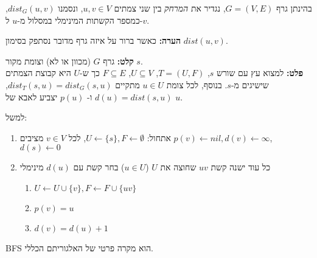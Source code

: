 \begin{definition}[מרחק]
בהינתן גרף 
$G = (V, E)$,
נגדיר את 
\emph{המרחק}
בין שני צמתים 
$u,v \in V$,
ונסמנו 
$dist_G(u,v)$,
כמספר הקשתות המינימלי במסלול מ-$u$ ל-$v$.
\end{definition}
\textbf{הערה:}
כאשר ברור על איזה גרף מדובר נסתפק בסימון 
$dist(u,v)$.

\vspace{5mm}
\textbf{קלט:}
גרף $G$ (מכוון או לא) וצומת מקור $s$.
\\
\textbf{פלט:}
למצוא עץ עם שורש $s$,
$T = (U, F)$, 
$U \subseteq V$, 
$F \subseteq E$
כך ש-$U$ היא קבוצת הצמתים שישיגים מ-$s$.
בנוסף, לכל צומת 
$u \in U$
מתקיים
$dist_T(s, u) = dist_G(s, u)$,
$d(u) = dist(s,u)$
ו-%
$p(u)$
יצביע לאבא של 
$u$.

למשל:
\begin{center}
\end{center}

\begin{enumerate}
\item
אתחול:
$U \leftarrow \{s\}, F \leftarrow \emptyset$, 
לכל 
$v \in V$
מציבים
$p(v) \leftarrow nil, d(v) \leftarrow \infty$,
$d(s) \leftarrow 0$
\item 
\label{item:bfs:while}
כל עוד ישנה קשת 
$uv$
שחוצה את $U$ 
($u \in U$)
בחר קשת עם 
$d(u)$
מינימלי
	\begin{enumerate}
	\item
	$U \leftarrow U \cup \{v\}, F \leftarrow F \cup \{uv\}$
	\item
	$p(v) = u$
	\item
	$d(v) = d(u) + 1$
	\end{enumerate}
\end{enumerate}
BFS
הוא מקרה פרטי של האלגוריתם הכללי.

